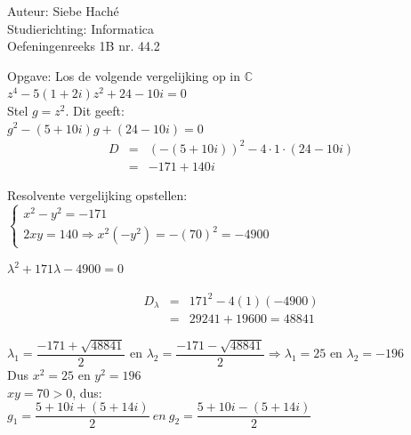 \documentclass[a4paper]{article}
\begin{document}
\noindent \large Auteur: Siebe Haché \\
\noindent \large Studierichting: Informatica\\
\noindent \large Oefeningenreeks 1B nr. 44.2\\

\medskip

\normalsize

Opgave: Los de volgende vergelijking op in $\mathbb{C}$\\

$ z^4 - 5(1 + 2i)z^2 + 24 - 10i = 0 $\\

Stel $g = z^2$. Dit geeft:\\

$g^2 - (5 + 10i)g + (24 - 10i) = 0$\\


\begin{eqnarray*}
D &=& (-(5 + 10i))^2 - 4 \cdot 1 \cdot (24 - 10i)\\
    &=& -171 + 140i
\end{eqnarray*}


Resolvente vergelijking opstellen:\\


$\left\{ \begin{array}{l} 

	x^2 - y^2 = -171\\ 
	
	2xy = 140 \Rightarrow x^2(-y^2) = -(70)^2 = -4900 
	
\end{array} \right. $


$\lambda^2 + 171\lambda - 4900 = 0 $

\begin{eqnarray*}
D_{\lambda} &=&171^2 - 4(1)(-4900) \\
		&=& 29241 + 19600 = 48841
\end{eqnarray*}


$\lambda_1 = \dfrac{-171 +  \sqrt{48841}}{2}$ en $\lambda_2 = \dfrac{-171 -  \sqrt{48841}}{2}\Rightarrow \lambda_1 = 25$
 en $\lambda_2 = -196 $ \\

Dus $x^2 = 25$ en $y^2 = 196$  \\

 $xy = 70 > 0$, dus:\\

$g_1 = \dfrac{5 + 10i + (5 + 14i)}{2}\  en \   g_2 = \dfrac{5 + 10i - (5 + 14i)}{2}$\\
\end{document}
